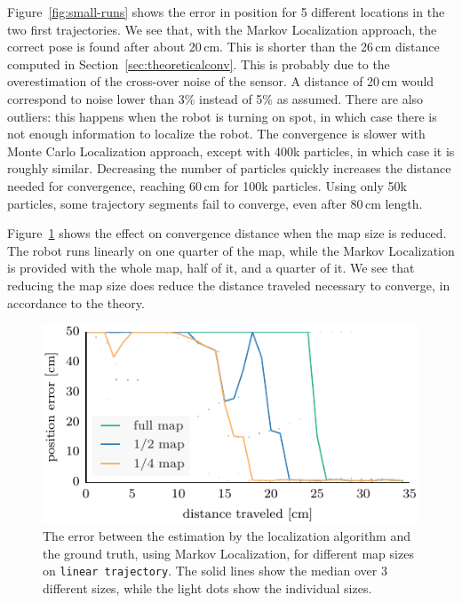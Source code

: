 \documentclass[letterpaper, 10pt, conference]{ieeeconf}
\newcommand{\Fig}[1]{Figure~\ref{fig:#1}}
\newcommand{\sect}[1]{Section~\ref{sec:#1}}
\begin{document}
\Fig{small-runs} shows the error in position for 5 different locations in the two first trajectories.
We see that, with the Markov Localization approach, the correct pose is found after about 20\,cm.
This is shorter than the 26\,cm distance computed in \sect{theoreticalconv}.
This is probably due to the overestimation of the cross-over noise of the sensor.
A distance of 20\,cm would correspond to noise lower than 3\% instead of 5\% as assumed.
There are also outliers: this happens when the robot is turning on spot, in which case there is not enough information to localize the robot.
The convergence is slower with Monte Carlo Localization approach, except with 400k particles, in which case it is roughly similar.
Decreasing the number of particles quickly increases the distance needed for convergence, reaching 60\,cm for 100k particles.
Using only 50k particles, some trajectory segments fail to converge, even after 80\,cm length.

\Fig{small-maps} shows the effect on convergence distance when the map size is reduced.
The robot runs linearly on one quarter of the map, while the Markov Localization is provided with the whole map, half of it, and a quarter of it.
We see that reducing the map size does reduce the distance traveled necessary to converge, in accordance to the theory.

\begin{figure}
\includegraphics{ml-small_maps-xy}
\caption{The error between the estimation by the localization algorithm and the ground truth, using Markov Localization, for different map sizes on \texttt{linear trajectory}.
The solid lines show the median over 3 different sizes, while the light dots show the individual sizes.}
\label{fig:small-maps}
\end{figure}
\end{document}
